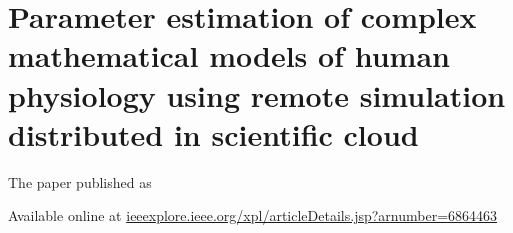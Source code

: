 \chapter{Parameter estimation of complex mathematical models of human physiology using remote simulation distributed in scientific cloud}\label{app:parameter}
The paper \cite{Kulhanek2014Parameters} published as
 

Available online at \href{http://ieeexplore.ieee.org/xpl/articleDetails.jsp?arnumber=6864463}{ieeexplore.ieee.org/xpl/articleDetails.jsp?arnumber=6864463}


